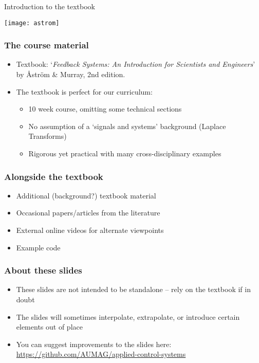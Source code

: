 \documentclass{beamer-control}
\begin{document}
\begin{frame}
\centering
\Large \alert{Introduction to the textbook}
\end{frame}

\begin{frame}
\texttt{[image: astrom]}
\end{frame}

\begin{frame}
\frametitle{The course material}
\begin{itemize}[<uncover@+->]
\item Textbook: `\emph{Feedback Systems: An Introduction for Scientists and Engineers}' by Åström \& Murray, 2nd edition.
\item The textbook is perfect for our curriculum:
\begin{itemize}
\item 10 week course, omitting some technical sections
\item No assumption of a `signals and systems' background (Laplace Transforms)
\item Rigorous yet practical with many cross-disciplinary examples
\end{itemize}
\end{itemize}
\end{frame}

\begin{frame}
\frametitle{Alongside the textbook}
\begin{itemize}
\item  Additional (background?) textbook material
\item  Occasional papers/articles from the literature
\item  External online videos for alternate viewpoints
\item  Example code
\end{itemize}
\end{frame}

\begin{frame}
\frametitle{About these slides}
\begin{itemize}
\item These slides are not intended to be standalone -- rely on the textbook if in doubt
\item The slides will sometimes interpolate, extrapolate, or introduce certain elements out of place
\item You can suggest improvements to the slides here: \url{https://github.com/AUMAG/applied-control-systems}
\end{itemize}
\end{frame}
\end{document}
